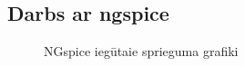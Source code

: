 \documentclass{report}
\begin{document}
\subsection{Darbs ar ngspice}
    \begin{figure}[h]
        \centering
        \label{fig:my_label2}
    \end{figure}
    \begin{figure}[h]
         \centering
        \caption{NGspice iegūtaie sprieguma grafiki}
        \label{fig:my_label3}
    \end{figure}
\end{document}

